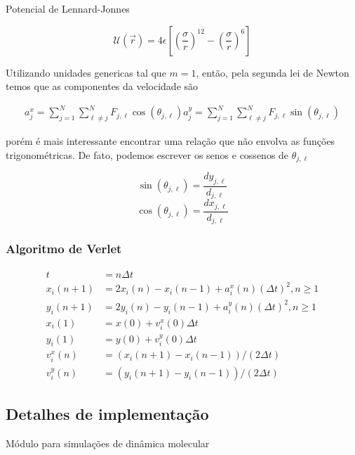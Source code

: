 Potencial de Lennard-Jonnes

\begin{equation}
    \mathcal{U}(\vec{r}) = 4 \epsilon \left[ \left(\frac{\sigma}{r} \right)^12 - \left(\frac{\sigma}{r}\right)^6 \right]
    \label{eq:potencial_lanner_jones}
\end{equation}

Utilizando unidades genericas tal que $m=1$, então, pela segunda lei de Newton temos que as componentes 
da velocidade são  

\begin{align}
    a^{x}_{j} = \sum_{j = 1}^{N} \sum_{\ell \neq j}^{N} F_{j, \ell} \cos(\theta_{j, \ell})
    a^{y}_{j} = \sum_{j = 1}^{N} \sum_{\ell \neq j}^{N} F_{j, \ell} \sin(\theta_{j, \ell})
\end{align}

porém é mais interessante encontrar uma relação que não envolva as funções trigonométricas. De fato, 
podemos escrever os senos e cossenos de $\theta_{j, \ell}$ 


$$ \sin(\theta_{j, \ell}) = \frac{dy_{j, \ell}}{d_{j, \ell}} $$
$$ \cos(\theta_{j, \ell}) = \frac{dx_{j, \ell}}{d_{j, \ell}} $$




\subsubsection{Algoritmo de Verlet}

\begin{align}
    t &= n \Delta t \\ 
    x_i(n+1) &= 2 x_i (n) - x_i (n-1)+ a_i^x (n) (\Delta t)^2, n \ge 1 \\ 
    y_i(n+1) &= 2 y_i (n) - y_i (n-1)+ a_i^y (n) (\Delta t)^2, n \ge 1 \\  
    x_i(1) &= x(0) + v_i^x (0) \Delta t \\ 
    y_i(1) &= y(0) + v_i^y (0) \Delta t \\ 
    v_i^x (n) &= \left( x_i(n+1) - x_i(n-1) \right) /(2 \Delta t)\\
    v_i^y (n) &= \left(  y_i(n+1) - y_i(n-1) \right) /(2 \Delta t)
\end{align}
\subsection{Detalhes de implementação}

Módulo para simulações de dinâmica molecular
